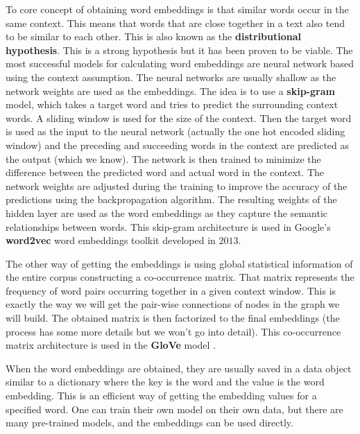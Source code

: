 \documentclass[12pt]{article}
\numberwithin{equation}{section}
\begin{document}
\begin{spacing}{1.5}
	To core concept of obtaining word embeddings is that similar words occur in the same context. This means that words that are close together in a text also tend to be similar to each other. This is also known as the \textbf{distributional hypothesis}. This is a strong hypothesis but it has been proven to be viable. The most successful models for calculating word embeddings are neural network based using the context assumption. The neural networks are usually shallow as the network weights are used as the embeddings. The idea is to use a \textbf{skip-gram} model, which takes a target word and tries to predict the surrounding context words. A sliding window is used for the size of the context. Then the target word is used as the input to the neural network (actually the one hot encoded sliding window) and the preceding and succeeding words in the context are predicted as the output (which we know). The network is then trained to minimize the difference between the predicted word and actual word in the context. The network weights are adjusted during the training to improve the accuracy of the predictions using the backpropagation algorithm. The resulting weights of the hidden layer are used as the word embeddings as they capture the semantic relationships between words. This skip-gram architecture is used in Google's \textbf{word2vec} word embeddings toolkit \cite{word2vec} developed in $2013$.
	
	The other way of getting the embeddings is using global statistical information of the entire corpus constructing a co-occurrence matrix. That matrix represents the frequency of word pairs occurring together in a given context window. This is exactly the way we will get the pair-wise connections of nodes in the graph we will build. The obtained matrix is then factorized to the final embeddings (the process has some more details but we won't go into detail). This co-occurrence matrix architecture is used in the \textbf{GloVe} model \cite{glove}.
	
	When the word embeddings are obtained, they are usually saved in a data object similar to a dictionary where the key is the word and the value is the word embedding. This is an efficient way of getting the embedding values for a specified word. One can train their own model on their own data, but there are many pre-trained models, and the embeddings can be used directly.
	

\end{spacing}
\end{document}
